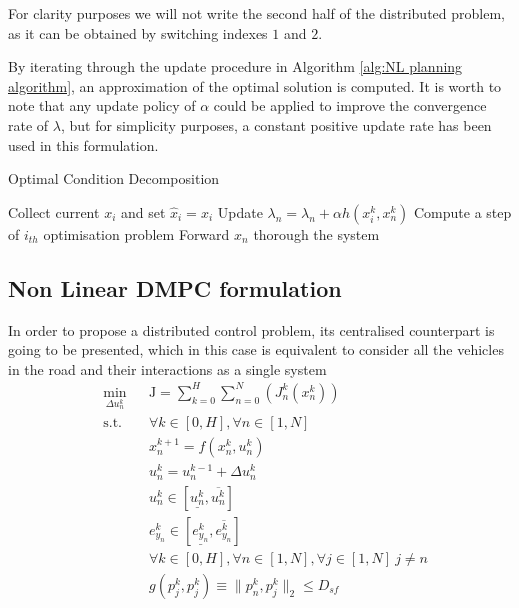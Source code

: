 \documentclass[letterpaper, 10 pt, conference]{ieeeconf}  %
\begin{document}
For clarity purposes we will not write the second half of the distributed problem, as it can be obtained by switching indexes $1$ and $2$. 

By iterating through the update procedure in Algorithm \ref{alg:NL planning algorithm}, an approximation of the optimal solution is computed. It is worth to note that any update policy of $\alpha$ could be applied to improve the convergence rate of $\lambda$, but for simplicity purposes, a constant positive update rate has been used in this formulation. 
\begin{algorithm}[h]
\caption{Optimal Condition Decomposition}
\label{alg:NL planning algorithm}
   \State Collect current $x_i$ and set $\hat{x}_i = x_i$
   \State Update ${\lambda_n} = {\lambda_n} + \alpha h(x^k_i,x^k_n)$
    \State Compute a step of $i_{th}$ optimisation problem
    \State Forward $x_n$ thorough the system
\EndWhile
\end{algorithm} 
\subsection {Non Linear DMPC formulation }
\label{NL MPC}
In order to propose a distributed control problem, its centralised counterpart is going to be presented, which in this case is equivalent to consider all the vehicles in the road and their interactions as a single system\\


\begin{equation}
\label{eq:opt problem}
\begin{aligned}
    & \underset{\Delta u^k_n}{\text{min}}  &&\mathrm{J}=\sum_{k=0}^{H} \sum_{n=0}^{N}( J^k_n(x^k_n)) \\
    & \text{s.t. } &&\forall k \in [0,H], \forall n \in [1,N]\\
    & && x^{k+1}_n = f(x^{k}_n,u^{k}_n)\\
    & && u^k_n = u^{k-1}_{n} + \Delta u^k_n \\ 
    & && u^k_n \in [\underline{u^k_n}, \overline{u^k_n} ] \\
    & && e_{y_{n}}^{k} \in [\underline{e_{y_{n}}^{k}}, \overline{e_{y_{n}}^{k}} ] \\
    &  &&\forall k \in [0,H], \forall n \in [1,N] ,\forall j \in [1,N]\ j \neq n\\
    & && g( p^{k}_j, p^{k}_j) \equiv \lVert p^{k}_n, p^{k}_j \rVert_2  \leq D_{sf} \\
\end{aligned}
\end{equation}
\end{document}
